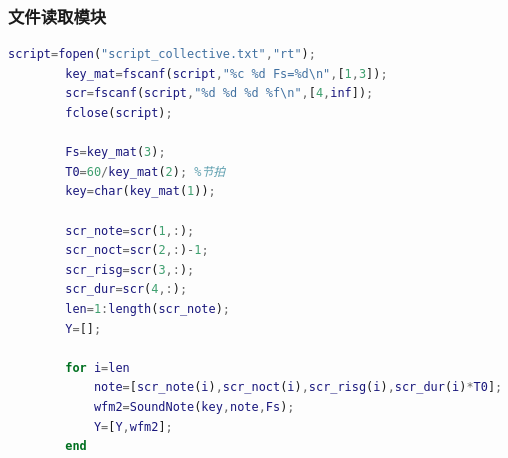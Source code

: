 \documentclass[utf8,10pt]{beamer}
\begin{document}
\begin{frame}[fragile]
    \frametitle{文件读取模块}

    \begin{lstlisting}[language=matlab,style=lgeneral,gobble=4]
        script=fopen("script_collective.txt","rt");
        key_mat=fscanf(script,"%c %d Fs=%d\n",[1,3]);
        scr=fscanf(script,"%d %d %d %f\n",[4,inf]);
        fclose(script);

        Fs=key_mat(3);
        T0=60/key_mat(2); %节拍
        key=char(key_mat(1));

        scr_note=scr(1,:);
        scr_noct=scr(2,:)-1;
        scr_risg=scr(3,:);
        scr_dur=scr(4,:);
        len=1:length(scr_note);
        Y=[];

        for i=len
            note=[scr_note(i),scr_noct(i),scr_risg(i),scr_dur(i)*T0];
            wfm2=SoundNote(key,note,Fs);
            Y=[Y,wfm2];
        end
    \end{lstlisting}

\end{frame}
\end{document}
